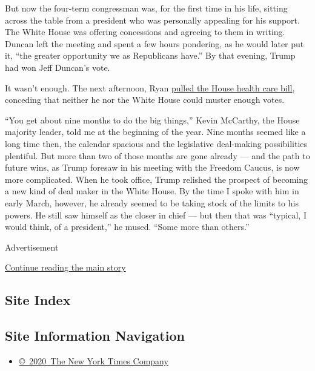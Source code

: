 But now the four-term congressman was, for the first time in his life,
sitting across the table from a president who was personally appealing
for his support. The White House was offering concessions and agreeing
to them in writing. Duncan left the meeting and spent a few hours
pondering, as he would later put it, ``the greater opportunity we as
Republicans have.'' By that evening, Trump had won Jeff Duncan's vote.

It wasn't enough. The next afternoon, Ryan
\href{https://www.nytimes3xbfgragh.onion/2017/03/24/us/politics/health-care-affordable-care-act.html}{pulled
the House health care bill}, conceding that neither he nor the White
House could muster enough votes.

``You get about nine months to do the big things,'' Kevin McCarthy, the
House majority leader, told me at the beginning of the year. Nine months
seemed like a long time then, the calendar spacious and the legislative
deal-making possibilities plentiful. But more than two of those months
are gone already --- and the path to future wins, as Trump foresaw in
his meeting with the Freedom Caucus, is now more complicated. When he
took office, Trump relished the prospect of becoming a new kind of deal
maker in the White House. By the time I spoke with him in early March,
however, he already seemed to be taking stock of the limits to his
powers. He still saw himself as the closer in chief --- but then that
was ``typical, I would think, of a president,'' he mused. ``Some more
than others.''

Advertisement

\protect\hyperlink{after-bottom}{Continue reading the main story}

\hypertarget{site-index}{%
\subsection{Site Index}\label{site-index}}

\hypertarget{site-information-navigation}{%
\subsection{Site Information
Navigation}\label{site-information-navigation}}

\begin{itemize}
\tightlist
\item
  \href{https://help.nytimes3xbfgragh.onion/hc/en-us/articles/115014792127-Copyright-notice}{©~2020~The
  New York Times Company}
\end{itemize}

